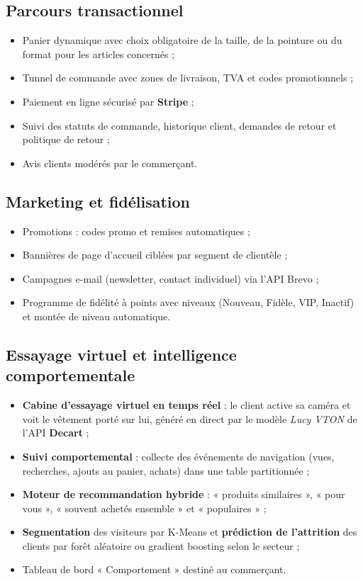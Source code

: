\subsection{Parcours transactionnel}
\begin{itemize}
    \item Panier dynamique avec choix obligatoire de la taille, de la pointure ou du format pour les articles concernés ;
    \item Tunnel de commande avec zones de livraison, TVA et codes promotionnels ;
    \item Paiement en ligne sécurisé par \textbf{Stripe} ;
    \item Suivi des statuts de commande, historique client, demandes de retour et politique de retour ;
    \item Avis clients modérés par le commerçant.
\end{itemize}

\subsection{Marketing et fidélisation}
\begin{itemize}
    \item Promotions : codes promo et remises automatiques ;
    \item Bannières de page d'accueil ciblées par segment de clientèle ;
    \item Campagnes e-mail (newsletter, contact individuel) via l'API Brevo ;
    \item Programme de fidélité à points avec niveaux (Nouveau, Fidèle, VIP, Inactif) et montée de niveau automatique.
\end{itemize}

\subsection{Essayage virtuel et intelligence comportementale}
\begin{itemize}
    \item \textbf{Cabine d'essayage virtuel en temps réel} : le client active sa caméra et voit le vêtement porté sur lui, généré en direct par le modèle \textit{Lucy VTON} de l'API \textbf{Decart} ;
    \item \textbf{Suivi comportemental} : collecte des événements de navigation (vues, recherches, ajouts au panier, achats) dans une table partitionnée ;
    \item \textbf{Moteur de recommandation hybride} : « produits similaires », « pour vous », « souvent achetés ensemble » et « populaires » ;
    \item \textbf{Segmentation} des visiteurs par K-Means et \textbf{prédiction de l'attrition} des clients par forêt aléatoire ou gradient boosting selon le secteur ;
    \item Tableau de bord « Comportement » destiné au commerçant.
\end{itemize}

